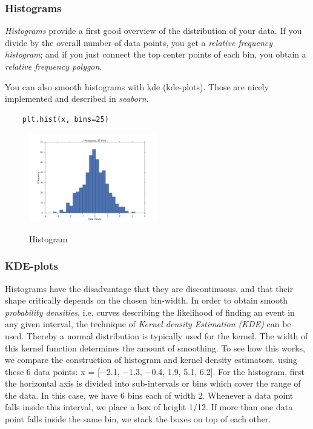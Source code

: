 \subsubsection{Histograms}


\emph{Histograms} provide a first good overview of the distribution of your data.
If you divide by the overall number of data points, you get a \emph{relative frequency
histogram}; and if you just connect the top center points of each bin, you obtain a
\emph{relative frequency polygon}.

You can also smooth histograms with \acrfull{kde} (kde-plots). Those are nicely implemented and described in \emph{seaborn}.

\begin{lstlisting}
    plt.hist(x, bins=25)
\end{lstlisting}

\begin{figure}[H]
  \centering
  \includegraphics[width=0.5\textwidth]{../Images/Histogram.png}\\
  \caption{Histogram}
\end{figure}

\subsubsection{KDE-plots}

Histograms have the disadvantage that they are discontinuous, and that their shape critically depends on the chosen bin-width. In order to obtain smooth \emph{probability densities}, i.e. curves describing the likelihood of finding an event in any given interval, the technique of \emph{Kernel \gls{density} Estimation (KDE)} can be used. Thereby a normal distribution is typically used for the kernel. The width of this kernel function determines the amount of smoothing. To see how this works, we compare the construction of histogram and kernel density estimators, using these 6 data points: x = [−2.1, −1.3, −0.4, 1.9, 5.1, 6.2]. For the histogram, first the horizontal axis is divided into sub-intervals or bins which cover the range of the data. In this case, we have 6 bins each of width 2. Whenever a data point falls inside this interval, we place a box of height 1/12. If more than one data point falls inside the same bin, we stack the boxes on top of each other.

